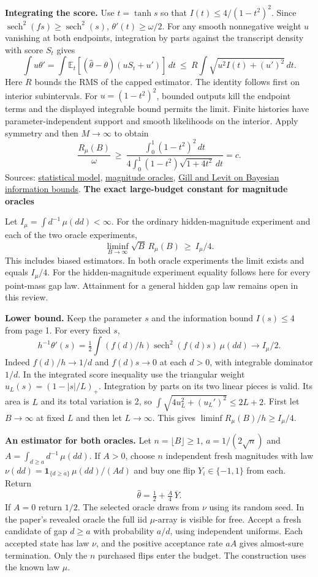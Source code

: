 \documentclass[11pt]{article}
\newcommand{\E}{\mathbb E}
\newcommand{\sech}{\operatorname{sech}}
\newcommand{\heading}[1]{{\LARGE\bfseries\color{ink} #1}\par\smallskip}
\newcommand{\src}[2]{\href{https://github.com/davidiach/adaptive-threshold-estimation/blob/97a501383083cc0fa64cb96405444048b8fd4053/#1}{#2}}
\begin{document}
\textbf{Integrating the score.}
Use $t=\tanh s$ so that $I(t)\le4/(1-t^2)^2$. Since $\sech^2(fs)\ge\sech^2(s)$, $\theta'(t)\ge\omega/2$. For any smooth nonnegative weight $u$ vanishing at both endpoints, integration by parts against the transcript density with score $S_t$ gives
\[
 \int u\theta'=\int \E_t[(\widehat\theta-\theta)(uS_t+u')]\,
 dt\ \le\ R\int\sqrt{u^2 I(t)+(u')^2}\,dt .
\]
Here $R$ bounds the RMS of the capped estimator. The identity follows first on interior subintervals. For $u=(1-t^2)^2$, bounded outputs kill the endpoint terms and the displayed integrable bound permits the limit. Finite histories have parameter-independent support and smooth likelihoods on the interior. Apply symmetry and then $M\to\infty$ to obtain
\[
 \frac{R_\mu(B)}{\omega}\ \ge\
 \frac{\int_0^1(1-t^2)^2\,dt}{4\int_0^1(1-t^2)\sqrt{1+4t^2}\,dt}=c .
\]
{\small Sources: \src{paper/v6/core.tex}{statistical model}, \src{lean/ThresholdHC/OracleLower/Model.lean}{magnitude oracles},
\href{https://dspace.library.uu.nl/bitstream/handle/1874/1190/van_trees.pdf?sequence=1}{Gill and Levit on Bayesian information bounds}.}
\newpage
\heading{The exact large-budget constant for magnitude oracles}
Let $I_\mu=\int d^{-1}\,\mu(dd)<\infty$. For the ordinary hidden-magnitude experiment and each of the two oracle experiments,
\[
  \liminf_{B\to\infty} \sqrt B\, R_\mu(B)\ \ge\ I_\mu/4 .
\]
This includes biased estimators. In both oracle experiments the limit exists and equals $I_\mu/4$. For the hidden-magnitude experiment equality follows here for every point-mass gap law. Attainment for a general hidden gap law remains open in this review.

\textbf{Lower bound.} Keep the parameter $s$ and the information bound $I(s)\le4$ from page 1. For every fixed $s$,
\[
 h^{-1}\theta'(s)=\tfrac12\int (f(d)/h)\sech^2(f(d)s)\,\mu(dd)
 \longrightarrow I_\mu/2 .
\]
Indeed $f(d)/h\to1/d$ and $f(d)s\to0$ at each $d>0$, with integrable dominator $1/d$. In the integrated score inequality use the triangular weight $u_L(s)=(1-|s|/L)_+$. Integration by parts on its two linear pieces is valid. Its area is $L$ and its total variation is 2, so $\int\sqrt{4u_L^2+(u_L')^2}\le2L+2$. First let $B\to\infty$ at fixed $L$ and then let $L\to\infty$. This gives $\liminf R_\mu(B)/h\ge I_\mu/4$.

\textbf{An estimator for both oracles.}
Let $n=\lfloor B\rfloor\ge1$, $a=1/(2\sqrt n)$ and $A=\int_{d\ge a}d^{-1}\,\mu(dd)$. If $A>0$, choose $n$ independent fresh magnitudes with law $\nu(dd)=\mathbf1_{\{d\ge a\}}\,\mu(dd)/(Ad)$ and buy one flip $Y_i\in\{-1,1\}$ from each. Return
\[
             \widehat\theta=\tfrac12+\tfrac A4\,\overline Y .
\]
If $A=0$ return $1/2$. The selected oracle draws from $\nu$ using its random seed. In the paper's revealed oracle the full iid $\mu$-array is visible for free. Accept a fresh candidate of gap $d\ge a$ with probability $a/d$, using independent uniforms. Each accepted state has law $\nu$, and the positive acceptance rate $aA$ gives almost-sure termination. Only the $n$ purchased flips enter the budget. The construction uses the known law $\mu$.
\end{document}
